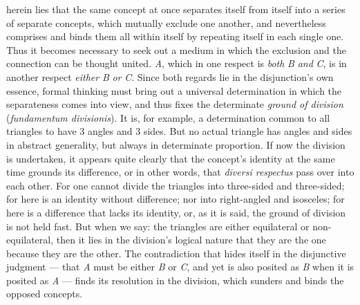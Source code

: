 \documentclass[12pt]{book}
\begin{document}
herein lies that the same concept at once separates itself from itself into
a series of separate concepts, which mutually exclude one another, and
nevertheless comprises and binds them all within itself by repeating itself
in each single one. Thus it becomes necessary to seek out a medium in which
the exclusion and the connection can be thought united. \textit{A}, which in
one respect is \emph{both} \textit{B} \emph{and} \textit{C}, is in another
respect \emph{either} \textit{B} \emph{or} \textit{C}. Since both regards
lie in the disjunction's own essence, formal thinking must bring out a
universal determination in which the separateness comes into view, and thus
fixes the determinate \emph{ground of division} (\textit{fundamentum
divisionis}). It is, for example, a determination common to all triangles to
have 3 angles and 3 sides. But no actual triangle has angles and sides in
abstract generality, but always in determinate proportion. If now the
division is undertaken, it appears quite clearly that the concept's identity
at the same time grounds its difference, or in other words, that
\textit{diversi respectus} pass over into each other. For one cannot divide
the triangles into three-sided and three-sided; for here is an identity
without difference; nor into right-angled and isosceles; for here is a
difference that lacks its identity, or, as it is said, the ground of
division is not held fast. But when we say: the triangles are either
equilateral or non-equilateral, then it lies in the division's logical
nature that they are the one because they are the other. The contradiction
that hides itself in the disjunctive judgment --- that \textit{A} must be
either \textit{B} or \textit{C}, and yet is also posited as \textit{B} when
it is posited as \textit{A} --- finds its resolution in the division, which
sunders and binds the opposed concepts.
\end{document}
